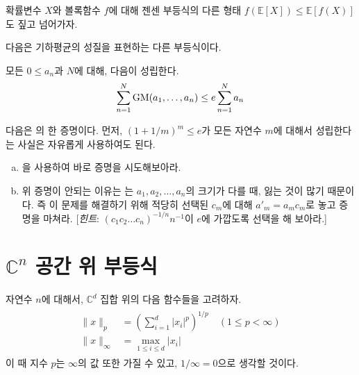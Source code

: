 \begin{remark}
    확률변수 $X$와 볼록함수 $f$에 대해 젠센 부등식의 다른 형태 $f(\mathbb{E}[X])\leq \mathbb{E}[f(X)]$도 짚고 넘어가자. 
\end{remark}
다음은 기하평균의 성질을 표현하는 다른 부등식이다.
\begin{theorem}[Carleman]
\label{thm:carlemanineq}  
    모든 $0 \leq a_n$과 $N$에 대해, 다음이 성립한다.
    \begin{equation*}
        \sum_{n = 1}^N \operatorname{GM}(a_1, \dots, a_n) \leq e \sum_{n = 1}^N a_n
    \end{equation*}
\end{theorem}

\begin{exercise}
    다음은 의 한 증명이다.
    먼저, $(1 + 1/m)^m \leq e$가 모든 자연수 $m$에 대해서 성립한다는 사실은 자유롭게 사용하여도 된다.

    \begin{enumerate}[(a)]
        \item {}을 사용하여 바로 증명을 시도해보아라.
        \item 위 증명이 안되는 이유는 는 $a_1, a_2, \dots, a_n$의 크기가 다를 때, 잃는 것이 많기 때문이다.
        즉 이 문제를 해결하기 위해 적당히 선택된 $c_m$에 대해 $a'_m = a_m c_m$로 놓고 증명을 마쳐라. [\textit{힌트}: $(c_1 c_2 \dots c_n)^{-1/n} n^{-1}$이 $e$에 가깝도록 선택을 해 보아라.]
    \end{enumerate}
\end{exercise}

\section{\texorpdfstring{$\mathbb{C}^n$ 공간 위 부등식}{C\textasciicircum n 공간 위 부등식}}
\label{sec:cninequality}
자연수 $n$에 대해서, $\mathbb{C}^d$ 집합 위의 다음 함수들을 고려하자.
\begin{align}
\label{eq:pnormdef}
\begin{split}
    \|x\|_p &= \left( \sum_{i = 1}^d |x_i|^p \right)^{1/p} \quad (1 \leq p < \infty) \\
    \|x\|_\infty &= \max_{1 \leq i \leq d} |x_i|
\end{split}
\end{align}
이 때 지수 $p$는 $\infty$의 값 또한 가질 수 있고, $1/\infty = 0$으로 생각할 것이다.

